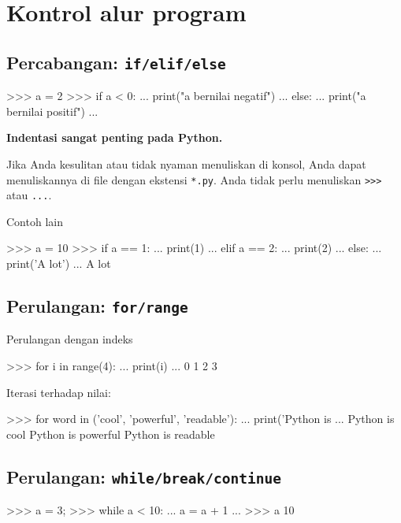 \section{Kontrol alur program}

\subsection{Percabangan: \texttt{if/elif/else}}
  
\begin{pyconcode}
>>> a = 2
>>> if a < 0:
...     print("a bernilai negatif")
... else:
...     print("a bernilai positif")
... 
\end{pyconcode}


\textbf{Indentasi sangat penting pada Python.}

Jika Anda kesulitan atau tidak nyaman menuliskan di konsol, Anda
dapat menuliskannya di file dengan ekstensi \texttt{*.py}.
Anda tidak perlu menuliskan \verb|>>>| atau \verb|...|.

Contoh lain
\begin{pyconcode}
>>> a = 10 
>>> if a == 1:
...     print(1)
... elif a == 2:
...     print(2)
... else:
...     print('A lot')
... 
A lot
\end{pyconcode}


\subsection{Perulangan: \texttt{for/range}}

Perulangan dengan indeks
\begin{pyconcode}
>>> for i in range(4):
...     print(i)
... 
0
1
2
3
\end{pyconcode}

Iterasi terhadap nilai:
\begin{pyconcode}
>>> for word in ('cool', 'powerful', 'readable'):
...     print('Python is %
...
Python is cool
Python is powerful
Python is readable
\end{pyconcode}

\subsection{Perulangan: \texttt{while/break/continue}}

\begin{pyconcode}
>>> a = 3;
>>> while a < 10:
...     a = a + 1
... 
>>> a
10
\end{pyconcode}

